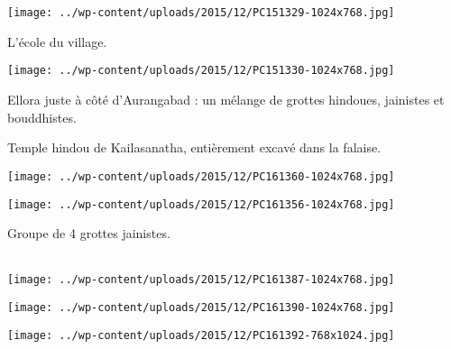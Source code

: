 ~\\~\\
\vspace{1.25mm}
\begin{center} \texttt{[image: ../wp-content/uploads/2015/12/PC151329-1024x768.jpg]} \end{center}

L'école du village.
\begin{center} \texttt{[image: ../wp-content/uploads/2015/12/PC151330-1024x768.jpg]} \end{center}
\vspace{-\topsep}
\pagebreak

Ellora juste à côté d'Aurangabad : un mélange de grottes hindoues, jainistes et bouddhistes. 

Temple hindou de Kailasanatha, entièrement excavé dans la falaise.
\begin{center} \texttt{[image: ../wp-content/uploads/2015/12/PC161360-1024x768.jpg]} \end{center}
\begin{center} \texttt{[image: ../wp-content/uploads/2015/12/PC161356-1024x768.jpg]} \end{center}
\vspace{-\topsep}
\vspace{-2.25mm}
\pagebreak

Groupe de 4 grottes jainistes.\\

~
\vspace{0.75mm}
\begin{center} \texttt{[image: ../wp-content/uploads/2015/12/PC161387-1024x768.jpg]} \end{center}
\begin{center} \texttt{[image: ../wp-content/uploads/2015/12/PC161390-1024x768.jpg]} \end{center}
\begin{center} \texttt{[image: ../wp-content/uploads/2015/12/PC161392-768x1024.jpg]} \end{center}

